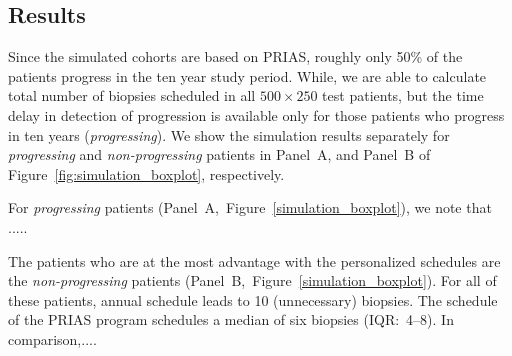 \subsection{Results}
Since the simulated cohorts are based on PRIAS, roughly only 50\% of the patients progress in the ten year study period. While, we are able to calculate total number of biopsies scheduled in all $500 \times 250$ test patients, but the time delay in detection of progression is available only for those patients who progress in ten years (\textit{progressing}). We show the simulation results separately for \textit{progressing} and \textit{non-progressing} patients in Panel~A, and Panel~B of Figure~\ref{fig:simulation_boxplot}, respectively.

For \textit{progressing} patients (Panel~A,~Figure~\ref{simulation_boxplot}), we note that .....

The patients who are at the most advantage with the personalized schedules are the \textit{non-progressing} patients (Panel~B,~Figure~\ref{simulation_boxplot}). For all of these patients, annual schedule leads to 10 (unnecessary) biopsies. The schedule of the PRIAS program schedules a median of six biopsies (IQR:~4--8). In comparison,....


